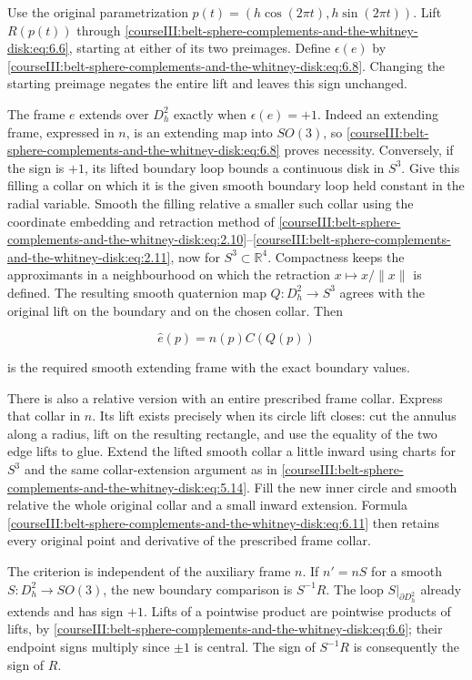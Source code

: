 Use the original parametrization
\(p(t)=(h\cos(2\pi t),h\sin(2\pi t))\).
Lift \(R(p(t))\) through \eqref{courseIII:belt-sphere-complements-and-the-whitney-disk:eq:6.6}, starting at either of its two preimages. Define \(\epsilon(e)\) by \eqref{courseIII:belt-sphere-complements-and-the-whitney-disk:eq:6.8}. Changing the starting preimage negates the entire lift and leaves this sign unchanged.

The frame \(e\) extends over \(D_h^2\) exactly when \(\epsilon(e)=+1\). Indeed an extending frame, expressed in \(n\), is an extending map into \(SO(3)\), so \eqref{courseIII:belt-sphere-complements-and-the-whitney-disk:eq:6.8} proves necessity. Conversely, if the sign is \(+1\), its lifted boundary loop bounds a continuous disk in \(S^3\). Give this filling a collar on which it is the given smooth boundary loop held constant in the radial variable. Smooth the filling relative a smaller such collar using the coordinate embedding and retraction method of \eqref{courseIII:belt-sphere-complements-and-the-whitney-disk:eq:2.10}--\eqref{courseIII:belt-sphere-complements-and-the-whitney-disk:eq:2.11}, now for \(S^3\subset\mathbb R^4\). Compactness keeps the approximants in a neighbourhood on which the retraction \(x\mapsto x/\|x\|\) is defined. The resulting smooth quaternion map \(Q:D_h^2\to S^3\) agrees with the original lift on the boundary and on the chosen collar. Then

\begin{equation}
\widehat e(p)=n(p)C(Q(p))
\label{courseIII:belt-sphere-complements-and-the-whitney-disk:eq:6.11}
\end{equation}

is the required smooth extending frame with the exact boundary values.

There is also a relative version with an entire prescribed frame collar. Express that collar in \(n\). Its lift exists precisely when its circle lift closes: cut the annulus along a radius, lift on the resulting rectangle, and use the equality of the two edge lifts to glue. Extend the lifted smooth collar a little inward using charts for \(S^3\) and the same collar-extension argument as in \eqref{courseIII:belt-sphere-complements-and-the-whitney-disk:eq:5.14}. Fill the new inner circle and smooth relative the whole original collar and a small inward extension. Formula \eqref{courseIII:belt-sphere-complements-and-the-whitney-disk:eq:6.11} then retains every original point and derivative of the prescribed frame collar.

The criterion is independent of the auxiliary frame \(n\). If \(n'=nS\) for a smooth \(S:D_h^2\to SO(3)\), the new boundary comparison is \(S^{-1}R\). The loop \(S|_{\partial D_h^2}\) already extends and has sign \(+1\). Lifts of a pointwise product are pointwise products of lifts, by \eqref{courseIII:belt-sphere-complements-and-the-whitney-disk:eq:6.6}; their endpoint signs multiply since \(\pm1\) is central. The sign of \(S^{-1}R\) is consequently the sign of \(R\).

